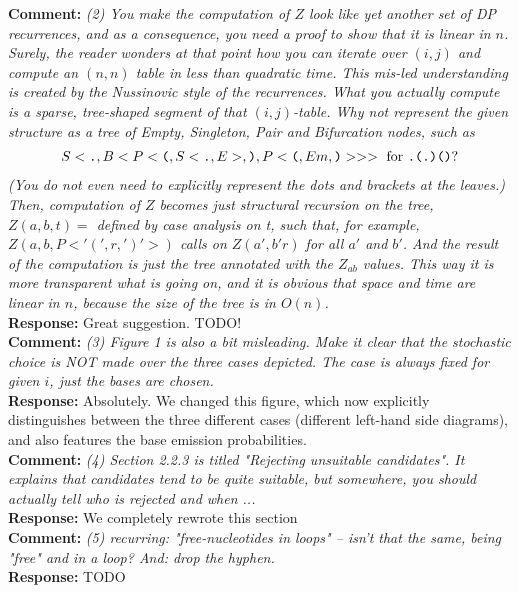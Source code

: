 \documentclass[11pt,hyperref,draft]{article} %
\newcommand{\Answer}[1]{\noindent\textsf{\textbf{Response: }}{\sf#1}\\}
\newcommand{\Comment}[1]{\noindent\textsf{\textbf{Comment: }}{\it#1}\\[.5em]}
\begin{document}
\Comment{(2) You make the computation of $Z$ look like yet another set of DP recurrences, and as a consequence, you need a proof to show that it is linear in $n$. Surely, the reader wonders at that point how you can iterate over $(i,j)$ and compute an $(n,n)$ table in less than quadratic time. This mis-led understanding is created by the Nussinovic style of the recurrences.
 What you actually compute is a sparse, tree-shaped segment of that $(i,j)$-table.
 Why not represent the given structure as a tree of Empty, Singleton, Pair and Bifurcation nodes, such as 
\begin{align*}
  S<\texttt{.},B<P<\texttt{(},S<\texttt{.},E>,\texttt{)},P<\texttt{(},Em,\texttt{)}>>> \text{ for {\tt .(.)()}}  ? 
\end{align*}
 (You do not even need to explicitly represent the dots and brackets at the leaves.)\\
 Then, computation of $Z$ becomes just structural recursion on the tree,
     $Z(a,b, t) =$ defined by case analysis on t, such that, for example,
     $Z(a,b,P<'(',r,')'>)$ calls on $Z(a',b' r)$ for all $a'$ and $b'$.
And the result of the computation is just the tree annotated with the $Z_{ab}$ values. 
This way it is more transparent what is going on, and it is obvious that space and time are linear in $n$, because the size of the tree is in $O(n)$.}
\Answer{Great suggestion. TODO!}

\Comment{(3) Figure 1 is also a bit misleading. Make it clear that the stochastic choice is NOT made over the three cases depicted. The case is always fixed for given $i$, just the bases are chosen.}
\Answer{Absolutely. We changed this figure, which now explicitly distinguishes between the three different cases (different left-hand side diagrams), and also features the base emission probabilities.}

\Comment{(4) Section 2.2.3 is titled "Rejecting unsuitable candidates". It explains that candidates tend to be quite suitable, but somewhere, you should actually tell who is rejected and when ... }
\Answer{We completely rewrote this section}

\Comment{(5) recurring: "free-nucleotides in loops" -- isn't that the same, being "free" and in a loop? And: drop the hyphen.}
\Answer{TODO}




\end{document}
